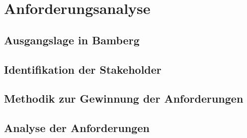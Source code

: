 \chapter{Anforderungsanalyse} %


\section{Ausgangslage in Bamberg}

\section{Identifikation der Stakeholder}

\section{Methodik zur Gewinnung der Anforderungen}

\section{Analyse der Anforderungen}